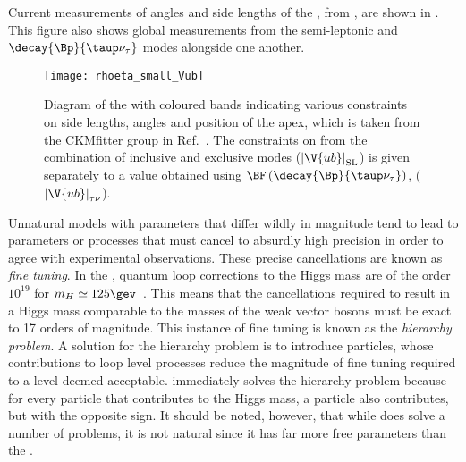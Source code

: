 Current measurements of angles and side lengths of the \ut, from , are shown
in .
This figure also shows
global  measurements from the semi-leptonic and $\decay{\Bp}{\taup\nu_\tau}$
modes alongside one another.


\begin{figure}
  \begin{center}
      \texttt{[image: rhoeta\_small\_Vub]}
  \end{center}
  \caption[Unitarity triangle and current constraints]
  {
    Diagram of the \ut with coloured bands indicating various constraints on
    side lengths, angles and position of the apex, which is taken from the CKMfitter group in
    Ref.~\protect\cite{Charles:2015gya}.
    The constraints on  from the combination of inclusive and exclusive modes
    ($\left|\V{ub}\right|_\mathrm{SL}$) is given separately to a value obtained using
    $\BF\left(\decay{\Bp}{\taup\nu_\tau}\right)$, ($\left|\V{ub}\right|_{\tau\nu}$).
  }
  \label{fig:th:ckmfitter}
\end{figure}

Unnatural \np models with parameters that differ wildly in magnitude tend to
lead to parameters or processes that must cancel to absurdly
high precision in order to agree with experimental observations.
These precise cancellations are known as \emph{fine tuning}.
In the \sm, quantum loop corrections to the Higgs mass are of the order $10^{19}$
for $m_H\simeq125\gev$~\cite{Chatrchyan:2012ufa,Aad:2012tfa}.
This means that the cancellations required to result in a Higgs mass comparable to the masses of
the weak vector bosons must be exact to 17 orders of magnitude.
This instance of fine tuning is known as the \emph{hierarchy problem}.
A solution for the hierarchy problem is to introduce \np particles, whose contributions to
loop level processes reduce the magnitude of fine tuning required to a level deemed
acceptable.
\SUSY immediately solves the hierarchy problem because for every \sm particle that
contributes to the Higgs mass, a \SUSY particle also contributes, but with the opposite sign.
It should be noted, however, that while \SUSY does solve a number of problems, it is not natural
since it has far more free parameters than the \sm.

